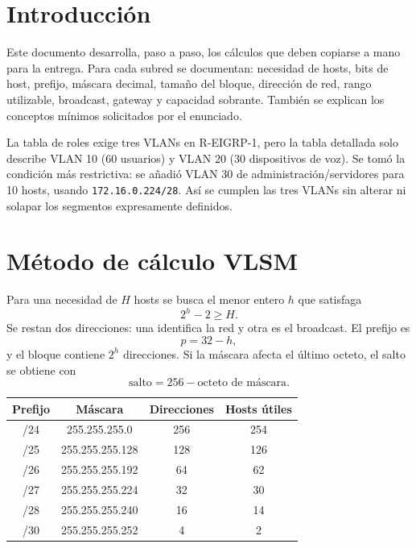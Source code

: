 \documentclass[11pt]{article}
\begin{document}
\tableofcontents
\newpage

\section{Introducción}

Este documento desarrolla, paso a paso, los cálculos que deben copiarse a mano para la entrega. Para cada subred se documentan: necesidad de hosts, bits de host, prefijo, máscara decimal, tamaño del bloque, dirección de red, rango utilizable, broadcast, gateway y capacidad sobrante. También se explican los conceptos mínimos solicitados por el enunciado.

\begin{decision}
La tabla de roles exige tres VLANs en R-EIGRP-1, pero la tabla detallada solo describe VLAN 10 (60 usuarios) y VLAN 20 (30 dispositivos de voz). Se tomó la condición más restrictiva: se añadió VLAN 30 de administración/servidores para 10 hosts, usando \texttt{172.16.0.224/28}. Así se cumplen las tres VLANs sin alterar ni solapar los segmentos expresamente definidos.
\end{decision}

\section{Método de cálculo VLSM}

Para una necesidad de $H$ hosts se busca el menor entero $h$ que satisfaga
\[
2^h-2\ge H.
\]
Se restan dos direcciones: una identifica la red y otra es el broadcast. El prefijo es
\[
p=32-h,
\]
y el bloque contiene $2^h$ direcciones. Si la máscara afecta el último octeto, el salto se obtiene con
\[
\text{salto}=256-\text{octeto de máscara}.
\]

\begin{center}
\begin{tabular}{c c c c}
\toprule
Prefijo & Máscara & Direcciones & Hosts útiles\\
\midrule
/24 & 255.255.255.0 & 256 & 254\\
/25 & 255.255.255.128 & 128 & 126\\
/26 & 255.255.255.192 & 64 & 62\\
/27 & 255.255.255.224 & 32 & 30\\
/28 & 255.255.255.240 & 16 & 14\\
/30 & 255.255.255.252 & 4 & 2\\
\bottomrule
\end{tabular}
\end{center}
\end{document}
